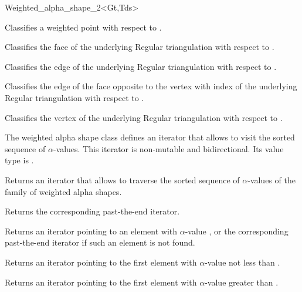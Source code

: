 \begin{ccClassTemplate} {Weighted_alpha_shape_2<Gt,Tds>}


{Classifies a weighted point  with respect to \ccVar.}

{Classifies the face  of the underlying Regular triangulation with respect to \ccVar.}

{Classifies the edge  of the underlying Regular triangulation with respect to \ccVar.}

{Classifies the edge of the face  opposite to the vertex with index  of the underlying Regular triangulation with respect to \ccVar.}	

{Classifies the vertex  of the underlying Regular triangulation with respect to \ccVar.}



\smallskip
The weighted alpha shape class defines an iterator that allows to visit the
sorted sequence of $\alpha$-values. This iterator is
non-mutable and bidirectional. Its value type is
.

{Returns an iterator that allows to traverse the
sorted sequence of $\alpha$-values of the family of weighted alpha shapes.}

{Returns the corresponding past-the-end iterator.}

{Returns an iterator pointing to an element with $\alpha$-value
, or the corresponding past-the-end iterator if such 
an element is not found.}

{Returns an iterator pointing to the first element with
$\alpha$-value not less than .}

{Returns an iterator pointing to the first element with $\alpha$-value
greater than .}


\end{ccClassTemplate}
